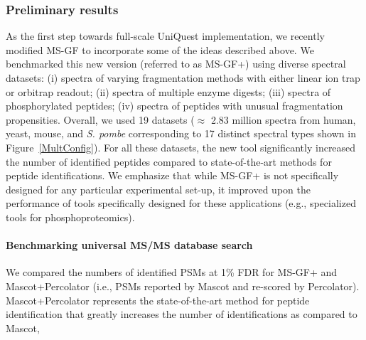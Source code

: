 \subsubsection{Preliminary results}

As the first step towards full-scale UniQuest implementation, we recently modified MS-GF to incorporate some of the ideas described above. 
We benchmarked this new version (referred to as MS-GF+) using diverse spectral datasets:
(i) spectra of varying fragmentation methods with either linear ion trap or orbitrap readout; %
(ii) spectra of multiple enzyme digests; 
(iii) spectra of phosphorylated peptides; 
(iv) spectra of peptides with unusual fragmentation propensities. Overall, we used 19 datasets ($\approx$ 2.83 million spectra from human, yeast, mouse, and {\em S. pombe}  corresponding to 17 distinct spectral types shown in Figure~\ref{MultConfig}). 
For all these datasets, the new tool 
significantly increased the number of identified peptides compared to state-of-the-art methods for peptide identifications.
We emphasize that while MS-GF+ is not specifically designed for any particular experimental set-up, it improved upon the performance of tools specifically designed for these applications (e.g., specialized  tools for phosphoproteomics).


\paragraph{Benchmarking universal MS/MS database search}

We compared the numbers of identified PSMs at 1\% FDR for MS-GF+ and Mascot+Percolator (i.e., PSMs reported by Mascot and re-scored by Percolator).
Mascot+Percolator represents the state-of-the-art method for peptide identification  that greatly increases the number of identifications as compared to Mascot,

